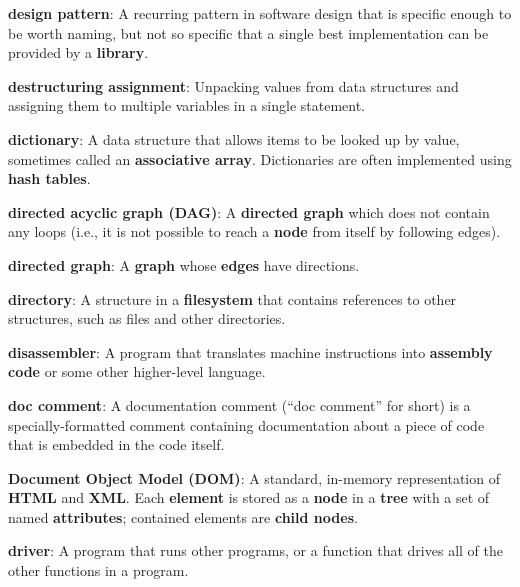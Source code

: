 \documentclass[krantzl]{krantz}
\newcommand{\glosskey}[1]{\textbf{#1}}
\begin{document}
\noindent \textbf{{\newline}\glosskey{design pattern}}: 
A recurring pattern in software design that is specific enough to be worth naming, but not so specific that a single best implementation can be provided by a \glosskey{library}.


\noindent \textbf{{\newline}\glosskey{destructuring assignment}}: 
Unpacking values from data structures and assigning them to multiple variables in a single statement.


\noindent \textbf{{\newline}\glosskey{dictionary}}: 
A data structure that allows items to be looked up by value, sometimes called an \glosskey{associative array}. Dictionaries are often implemented using \glosskey{hash tables}.


\noindent \textbf{{\newline}\glosskey{directed acyclic graph} (DAG)}: 
A \glosskey{directed graph} which does not contain any loops (i.e., it is not possible to reach a \glosskey{node} from itself by following edges).


\noindent \textbf{{\newline}\glosskey{directed graph}}: 
A \glosskey{graph} whose \glosskey{edges} have directions.


\noindent \textbf{{\newline}\glosskey{directory}}: 
A structure in a \glosskey{filesystem} that contains references to other structures, such as files and other directories.


\noindent \textbf{{\newline}\glosskey{disassembler}}: 
A program that translates machine instructions into \glosskey{assembly code} or some other higher-level language.


\noindent \textbf{{\newline}\glosskey{doc comment}}: 
A documentation comment (“doc comment” for short) is a specially-formatted comment containing documentation about a piece of code that is embedded in the code itself.


\noindent \textbf{{\newline}\glosskey{Document Object Model} (DOM)}: 
A standard, in-memory representation of \glosskey{HTML} and \glosskey{XML}. Each \glosskey{element} is stored as a \glosskey{node} in a \glosskey{tree} with a set of named \glosskey{attributes}; contained elements are \glosskey{child nodes}.


\noindent \textbf{{\newline}\glosskey{driver}}: 
A program that runs other programs, or a function that drives all of the other functions in a program.
\end{document}
